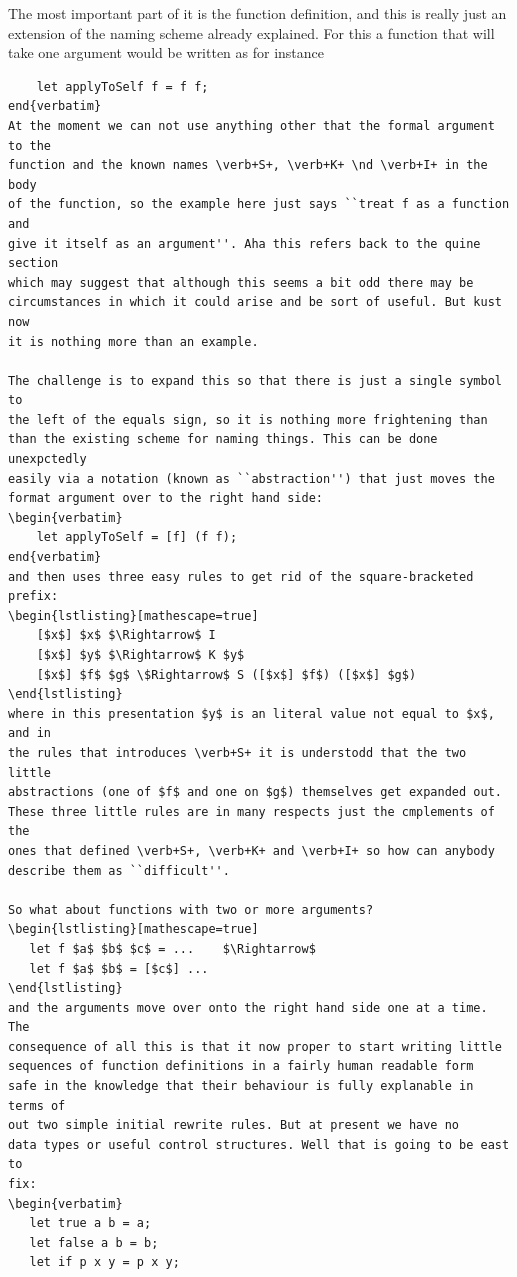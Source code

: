 The most important part of it is the function definition, and this
is really just an extension of the naming scheme already explained.
For this a function that will take one argument would be written
as for instance
\begin{verbatim}
    let applyToSelf f = f f;
end{verbatim}
At the moment we can not use anything other that the formal argument to the
function and the known names \verb+S+, \verb+K+ \nd \verb+I+ in the body
of the function, so the example here just says ``treat f as a function and
give it itself as an argument''. Aha this refers back to the quine section
which may suggest that although this seems a bit odd there may be
circumstances in which it could arise and be sort of useful. But kust now
it is nothing more than an example.

The challenge is to expand this so that there is just a single symbol to
the left of the equals sign, so it is nothing more frightening than
than the existing scheme for naming things. This can be done unexpctedly
easily via a notation (known as ``abstraction'') that just moves the
format argument over to the right hand side:
\begin{verbatim}
    let applyToSelf = [f] (f f);
end{verbatim}
and then uses three easy rules to get rid of the square-bracketed prefix:
\begin{lstlisting}[mathescape=true]
    [$x$] $x$ $\Rightarrow$ I
    [$x$] $y$ $\Rightarrow$ K $y$
    [$x$] $f$ $g$ \$Rightarrow$ S ([$x$] $f$) ([$x$] $g$)
\end{lstlisting}
where in this presentation $y$ is an literal value not equal to $x$, and in
the rules that introduces \verb+S+ it is understodd that the two little
abstractions (one of $f$ and one on $g$) themselves get expanded out.
These three little rules are in many respects just the cmplements of the
ones that defined \verb+S+, \verb+K+ and \verb+I+ so how can anybody
describe them as ``difficult''.

So what about functions with two or more arguments?
\begin{lstlisting}[mathescape=true]
   let f $a$ $b$ $c$ = ...    $\Rightarrow$
   let f $a$ $b$ = [$c$] ...
\end{lstlisting}
and the arguments move over onto the right hand side one at a time. The
consequence of all this is that it now proper to start writing little
sequences of function definitions in a fairly human readable form
safe in the knowledge that their behaviour is fully explanable in terms of
out two simple initial rewrite rules. But at present we have no
data types or useful control structures. Well that is going to be east to
fix:
\begin{verbatim}
   let true a b = a;
   let false a b = b;
   let if p x y = p x y;
\end{verbatim}
